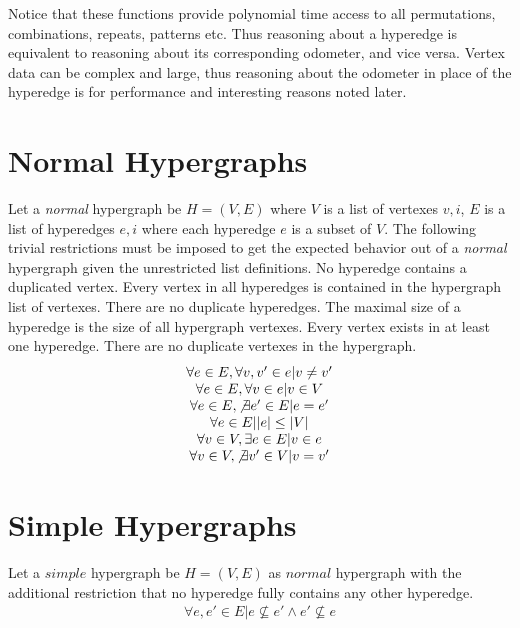 Notice that these functions provide polynomial time access to all permutations, combinations, repeats, patterns etc. Thus reasoning about a hyperedge is equivalent to reasoning about its corresponding odometer, and vice versa. Vertex data can be complex and large, thus reasoning about the odometer in place of the hyperedge is for performance and interesting reasons noted later.
\newpage

\section{Normal Hypergraphs \cite{Hypergraph:Book}}
Let a \textit{normal} hypergraph be $H = (V,E)$ where $V$ is a list of vertexes ${v,i}$, $E$ is a list of hyperedges ${e,i}$ where each hyperedge $e$ is a subset of $V$. The following trivial restrictions must be imposed to get the expected behavior out of a \textit{normal} hypergraph given the unrestricted list definitions. No hyperedge contains a duplicated vertex. Every vertex in all hyperedges is contained in the hypergraph list of vertexes. There are no duplicate hyperedges. The maximal size of a hyperedge is the size of all hypergraph vertexes. Every vertex exists in at least one hyperedge. There are no duplicate vertexes in the hypergraph.\\


\begin{equation*}
\begin{matrix}
\forall e \in E , \forall v, v' \in e \vert v \ne v'\\
\forall e \in E , \forall v \in e \vert v \in V\\
\forall e \in E , \not\exists e' \in E \vert e = e'\\
\forall e \in E \vert |e| \le |V|\\
\forall v \in V , \exists e \in E \vert v \in e\\
\forall v \in V , \not\exists v' \in V \vert v = v'\\
\end{matrix}
\end{equation*}

\section{Simple Hypergraphs}
Let a $simple$ hypergraph be $H=(V,E)$ as $normal$ hypergraph with the additional restriction that no hyperedge fully contains any other hyperedge. \begin{equation*}
\begin{matrix}
\forall e , e' \in E \vert e \not \subseteq e' \wedge e' \not \subseteq e\\
\end{matrix}
\end{equation*}

